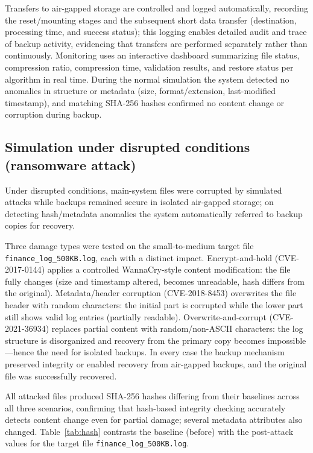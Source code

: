 \documentclass{iaesarticle}
\begin{document}
Transfers to air-gapped storage are controlled and logged automatically, recording the reset/mounting stages and the subsequent short data transfer (destination, processing time, and success status); this logging enables detailed audit and trace of backup activity, evidencing that transfers are performed separately rather than continuously. Monitoring uses an interactive dashboard summarizing file status, compression ratio, compression time, validation results, and restore status per algorithm in real time. During the normal simulation the system detected no anomalies in structure or metadata (size, format/extension, last-modified timestamp), and matching SHA-256 hashes confirmed no content change or corruption during backup.

\subsection{Simulation under disrupted conditions (ransomware attack)}
Under disrupted conditions, main-system files were corrupted by simulated attacks while backups remained secure in isolated air-gapped storage; on detecting hash/metadata anomalies the system automatically referred to backup copies for recovery.

Three damage types were tested on the small-to-medium target file \texttt{finance\_log\_500KB.log}, each with a distinct impact. Encrypt-and-hold (CVE-2017-0144) applies a controlled WannaCry-style content modification: the file fully changes (size and timestamp altered, becomes unreadable, hash differs from the original). Metadata/header corruption (CVE-2018-8453) overwrites the file header with random characters: the initial part is corrupted while the lower part still shows valid log entries (partially readable). Overwrite-and-corrupt (CVE-2021-36934) replaces partial content with random/non-ASCII characters: the log structure is disorganized and recovery from the primary copy becomes impossible---hence the need for isolated backups. In every case the backup mechanism preserved integrity or enabled recovery from air-gapped backups, and the original file was successfully recovered.

All attacked files produced SHA-256 hashes differing from their baselines across all three scenarios, confirming that hash-based integrity checking accurately detects content change even for partial damage; several metadata attributes also changed. Table~\ref{tab:hash} contrasts the baseline (before) with the post-attack values for the target file \texttt{finance\_log\_500KB.log}.
\end{document}
